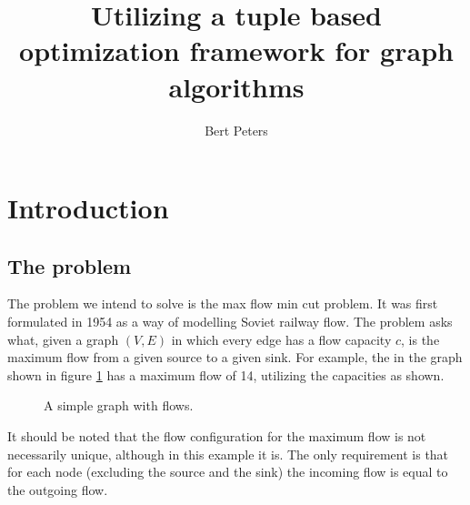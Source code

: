 \documentclass[10pt,a4paper,hidelinks]{article}
\author{Bert Peters}
\title{Utilizing a tuple based optimization framework for graph algorithms}
\begin{document}
\maketitle

\tableofcontents

\section{Introduction}

\subsection{The problem}

The problem we intend to solve is the max flow min cut problem. It was first formulated in 1954 as a way of modelling Soviet railway flow\cite{HarrisRoss}. The problem asks what, given a graph $(V,E)$ in which every edge has a flow capacity $c$, is the maximum flow from a given source to a given sink. For example, the in the graph shown in figure \ref{fig:simple graph} has a maximum flow of 14, utilizing the capacities as shown.

\begin{figure}[h]
\centering
{}
\caption{A simple graph with flows.}
\label{fig:simple graph}
\end{figure}

It should be noted that the flow configuration for the maximum flow is not necessarily unique, although in this example it is. The only requirement is that for each node (excluding the source and the sink) the incoming flow is equal to the outgoing flow.
\end{document}
